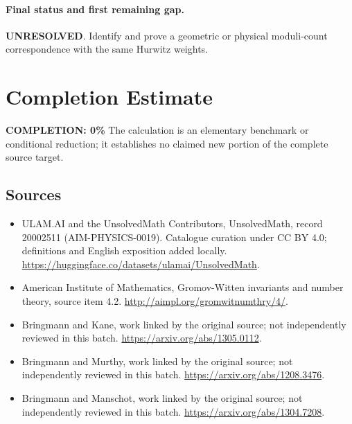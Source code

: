 \documentclass[11pt]{article}
\begin{document}
\paragraph{Final status and first remaining gap.}
\textbf{UNRESOLVED}. Identify and prove a geometric or physical moduli-count correspondence with the same Hurwitz weights.

\section{Completion Estimate}
\noindent\textbf{COMPLETION: 0\%}
The calculation is an elementary benchmark or conditional reduction; it establishes no claimed new portion of the complete source target.

\subsection{Sources}
\begin{itemize}
\item[\hypertarget{source:20002511:1}{S1}] ULAM.AI and the UnsolvedMath Contributors, UnsolvedMath, record 20002511 (AIM-PHYSICS-0019). Catalogue curation under CC BY 4.0; definitions and English exposition added locally.
\url{https://huggingface.co/datasets/ulamai/UnsolvedMath}.
\item[\hypertarget{source:20002511:2}{S2}] American Institute of Mathematics, Gromov-Witten invariants and number theory, source item 4.2.
\url{http://aimpl.org/gromwitnumthry/4/}.
\item[\hypertarget{source:20002511:3}{S3}] Bringmann and Kane, work linked by the original source; not independently reviewed in this batch.
\url{https://arxiv.org/abs/1305.0112}.
\item[\hypertarget{source:20002511:4}{S4}] Bringmann and Murthy, work linked by the original source; not independently reviewed in this batch.
\url{https://arxiv.org/abs/1208.3476}.
\item[\hypertarget{source:20002511:5}{S5}] Bringmann and Manschot, work linked by the original source; not independently reviewed in this batch.
\url{https://arxiv.org/abs/1304.7208}.
\end{itemize}
\label{end:20002511}
\end{document}

